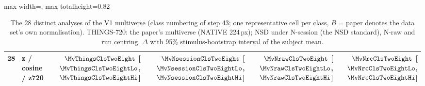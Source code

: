 \begin{table}[H]
\begin{adjustbox}{max width=\textwidth, max totalheight=0.82\textheight}
\begin{tabular}{@{}rlrrrr@{}}
28 & z / cosine / z720 & $\MvThingsClsTwoEight$ {\scriptsize [$\MvThingsClsTwoEightLo$, $\MvThingsClsTwoEightHi$]} & $\MvNsessionClsTwoEight$ {\scriptsize [$\MvNsessionClsTwoEightLo$, $\MvNsessionClsTwoEightHi$]} & $\MvNrawClsTwoEight$ {\scriptsize [$\MvNrawClsTwoEightLo$, $\MvNrawClsTwoEightHi$]} & $\MvNrcClsTwoEight$ {\scriptsize [$\MvNrcClsTwoEightLo$, $\MvNrcClsTwoEightHi$]} \\
\bottomrule
\end{tabular}
\end{adjustbox}
\caption{The 28 distinct analyses of the V1 multiverse (class numbering of step 43; one representative cell per class, $B$ = paper denotes the data set's own normalisation). THINGS-720: the paper's multiverse (NATIVE 224\,px); NSD under N-session (the NSD standard), N-raw and run centring. $\Delta$ with 95\% stimulus-bootstrap interval of the subject mean.}
\label{tab:multi28}
\end{table}
